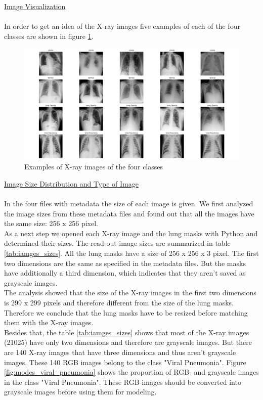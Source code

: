 \documentclass{article}
\begin{document}
\vspace{0.5cm}

\noindent \underline{Image Visualization}\\
\\
In order to get an idea of the X-ray images five examples of each of the four classes are shown in figure \ref{fig:example_xray_classes}.


\begin{figure}[h!] %
    \centering
    \includegraphics[width=1.0\linewidth]{20figures_grid.png}
    \caption{Examples of X-ray images of the four classes}
    \label{fig:example_xray_classes}
\end{figure}

\vspace{0.5cm}

\noindent \underline{Image Size Distribution and Type of Image}\\
\\
In the four files with metadata the size of each image is given. We first analyzed the image sizes from these metadata files and found out that all the images have the same size: 256 x 256 pixel. \\
As a next step we opened each X-ray image and the lung masks with Python and determined their sizes. The read-out image sizes are summarized in table \ref{tab:iamges_sizes}. All the lung masks have a size of 256 x 256 x 3 pixel. The first two dimensions are the same as specified in the metadata files. But the masks have additionally a third dimension, which indicates that they aren't saved as grayscale images. \\
The analysis showed that the size of the X-ray images in the first two dimensions is 299 x 299 pixels and therefore different from the size of the lung masks. Therefore we conclude that the lung masks have to be resized before matching them with the X-ray images. \\
Besides that, the table \ref{tab:iamges_sizes} shows that most of the X-ray images (21025) have only two dimensions and therefore are grayscale images. But there are 140 X-ray images that have three dimensions and thus aren't grayscale images. These 140 RGB images belong to the class "Viral Pneumonia". Figure \ref{fig:modes_viral_pneumonia} shows the proportion of RGB- and grayscale images in the class "Viral Pneumonia". These RGB-images should be converted into grayscale images before using them for modeling. \\
\end{document}
